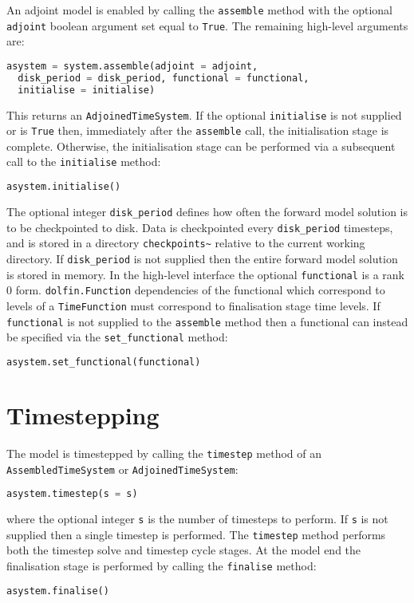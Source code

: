 \documentclass[a4paper]{book}
\begin{document}
An adjoint model is enabled by calling the \verb+assemble+ method with the
optional \verb+adjoint+ boolean argument set equal to \verb+True+. The remaining
high-level arguments are:
\begin{lstlisting}[language = python, frame = single, basicstyle=\footnotesize]
asystem = system.assemble(adjoint = adjoint,
  disk_period = disk_period, functional = functional,
  initialise = initialise)
\end{lstlisting}
This returns an \verb+AdjoinedTimeSystem+. If the optional \verb+initialise+ is
not supplied or is \verb+True+ then, immediately after the \verb+assemble+ call,
the initialisation stage is complete. Otherwise, the initialisation stage can be
performed via a subsequent call to the \verb+initialise+ method:
\begin{lstlisting}[language = python, frame = single, basicstyle=\footnotesize]
asystem.initialise()
\end{lstlisting}
The optional integer \verb+disk_period+ defines how often the forward model
solution is to be checkpointed to disk. Data is checkpointed every
\verb+disk_period+ timesteps, and is stored in a directory \verb+checkpoints~+
relative to the current working directory. If \verb+disk_period+ is not supplied
then the entire forward model solution is stored in memory. In the high-level
interface the optional \verb+functional+ is a rank 0 form.
\verb+dolfin.Function+ dependencies of the functional which correspond to levels
of a \verb+TimeFunction+ must correspond to finalisation stage time levels. If
\verb+functional+ is not supplied to the \verb+assemble+ method then a
functional can instead be specified via the \verb+set_functional+ method:
\begin{lstlisting}[language = python, frame = single, basicstyle=\footnotesize]
asystem.set_functional(functional)
\end{lstlisting}

\section{Timestepping}

The model is timestepped by calling the \verb+timestep+ method of an \linebreak
\verb+AssembledTimeSystem+ or \verb+AdjoinedTimeSystem+:
\begin{lstlisting}[language = python, frame = single, basicstyle=\footnotesize]
asystem.timestep(s = s)
\end{lstlisting}
where the optional integer \verb+s+ is the number of timesteps to perform. If
\verb+s+ is not supplied then a single timestep is performed. The
\verb+timestep+ method performs both the timestep solve and timestep cycle
stages. At the model end the finalisation stage is performed by calling the
\verb+finalise+ method:
\begin{lstlisting}[language = python, frame = single, basicstyle=\footnotesize]
asystem.finalise()
\end{lstlisting}
\end{document}
